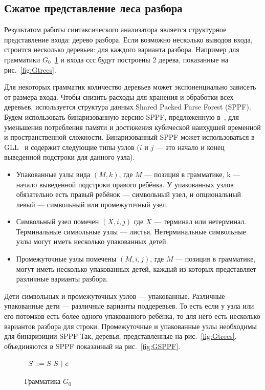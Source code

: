 \documentclass[14pt]{matmex-diploma-custom}
\begin{document}
	\subsection{Сжатое представление леса разбора}
	Результатом работы синтаксического анализатора является структурное представление
    входа: дерево разбора. Если возможно несколько выводов входа, строится несколько деревьев:
    для каждого варианта разбора. Например для грамматики $G_0$~\ref{fig:fig0} и входа $ссс$
    будут построены 2 дерева, показанные на рис.~\ref{fig:Gtrees}.
    
    Для некоторых грамматик количество деревьев может экспоненциально зависеть от размера входа.
    Чтобы снизить расходы для хранения и обработки всех деревьев, используется структура данных
    Shared Packed Parse Forest (SPPF). 
    Будем использовать бинаризованную версию SPPF, предложенную в~\cite{brnglr}, для уменьшения
    потребления памяти и достижения кубической наихудшей временной и пространственной сложности.
    Бинаризованный SPPF может использоваться в GLL~\cite{scott2013gll} и содержит следующие типы узлов
    ($i$ и $j$ --- это начало и конец выведенной подстроки для данного узла).
    \begin{itemize}
        \item Упакованные узлы вида $(M, k)$, где $M$ --- позиция в грамматике, k --- начало выведенной
        подстроки правого ребёнка. У упакованных узлов обязательно есть правый ребёнок ---
        символьный узел, и опциональный левый --- символьный или промежуточный узел.
        \item Символьный узел помечен $(X, i, j)$ где $X$ --- терминал или нетерминал.
        Терминальные символьные узлы --- листья. 
        Нетерминальные символьные узлы могут иметь несколько упакованных детей. 
        \item Промежуточные узлы помечены $ (M, i, j) $, где $M$ --- позиция в грамматике, 
        могут иметь несколько упакованных детей, каждый из которых представляет различные варианты разбора.
    \end{itemize}
    Дети символьных и промежуточных узлов --- упакованные. Различные упакованные дети --- различные варианты поддеревьев.
    То есть если у узла или его потомков есть более одного упакованного ребёнка, то для него есть несколько вариантов 
    разбора для строки. Промежуточные и упакованные узлы необходимы для бинаризиции SPPF
    Так, деревья, представленные на рис.~\ref{fig:Gtrees}, объединяются в SPPF показанный на рис.~\ref{fig:GSPPF}.
    \begin{figure}
        \centering
        $
        \begin{array}[b]{rl}
        S ::= S\ S\ | \ c \ \ \ 
        \end{array}
        $
        \caption{Грамматика $G_0$}
        \label{fig:fig0}
    \end{figure}
\end{document}
